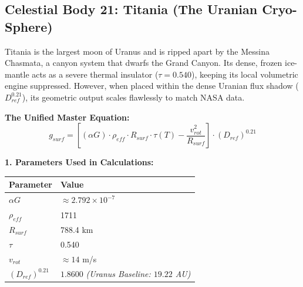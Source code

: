\documentclass[11pt, a4paper]{article}
\begin{document}
\clearpage
\subsection{Celestial Body 21: Titania (The Uranian Cryo-Sphere)}
  Titania is the largest moon of Uranus and is ripped apart by the Messina Chasmata, a canyon system that dwarfs the Grand Canyon. Its dense, frozen ice-mantle acts as a severe thermal insulator ($\tau = 0.540$), keeping its local volumetric engine suppressed. However, when placed within the dense Uranian flux shadow ($D_{ref}^{0.21}$), its geometric output scales flawlessly to match NASA data.

  \vspace{0.5em}
  \noindent \textbf{The Unified Master Equation:}
  $$ g_{surf} = \left[ (\alpha G) \cdot \rho_{eff} \cdot R_{surf} \cdot \tau(T) - \frac{v_{rot}^2}{R_{surf}} \right] \cdot (D_{ref})^{0.21} $$

  \vspace{0.5em}
  \noindent \textbf{1. Parameters Used in Calculations:} \\[0.5em]
  \begingroup
  \renewcommand{\arraystretch}{1.3}
  \hspace*{2em}
  \begin{tabular}{|l|l|}
    \hline
    \textbf{Parameter} & \textbf{Value} \\ \hline
    $\alpha G$ & $\approx 2.792 \times 10^{-7}$ \\ \hline
    $\rho_{eff}$ & 1711 \\ \hline
    $R_{surf}$ & 788.4 km \\ \hline
    $\tau$ & 0.540 \\ \hline
    $v_{rot}$ & $\approx 14$ m/s \\ \hline
    $(D_{ref})^{0.21}$ & $1.8600$ \textit{(Uranus Baseline: $19.22$ AU)} \\ \hline
  \end{tabular}
  \endgroup
\end{document}
